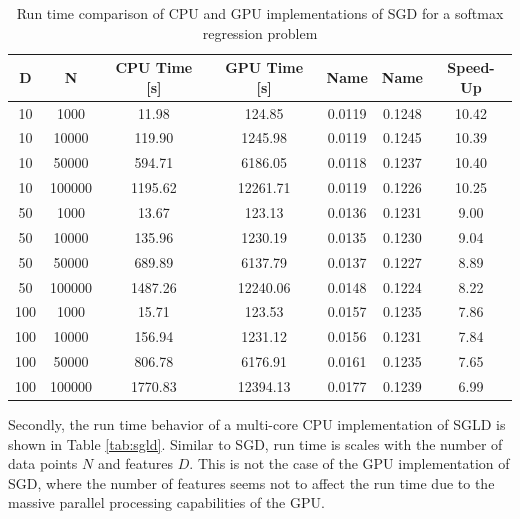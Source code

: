\documentclass[9pt,lineno]{crone}
\begin{document}
\begin{table}[h]
	\centering
 \begin{tabular}{|c|c|c|c|c|c|c|}
 	\hline 
 	D & N & CPU Time [s] & GPU Time [s] & Name & Name & Speed-Up\\ 
 	\hline 
 	10 &	1000&	11.98&	124.85& 0.0119& 0.1248& 10.42\\
 	10&	10000&	119.90&	1245.98& 0.0119& 0.1245& 10.39\\
 	10&	50000&	594.71&	6186.05& 0.0118& 0.1237& 10.40\\
 	10&	100000&	1195.62&	12261.71& 0.0119& 0.1226& 10.25\\
 	\hline
 	50&	1000&	13.67&	123.13& 0.0136& 0.1231& 9.00\\
 	50&	10000&	135.96&	1230.19& 0.0135& 0.1230& 9.04\\
 	50&	50000&	689.89&	6137.79& 0.0137& 0.1227& 8.89\\
 	50&	100000&	1487.26&	12240.06& 0.0148& 0.1224& 8.22\\
 	\hline
 	100&	1000&	15.71&	123.53& 0.0157& 0.1235& 7.86\\
 	100	&10000&	156.94&	1231.12& 0.0156& 0.1231& 7.84\\
 	100&	50000&	806.78&	6176.91& 0.0161& 0.1235& 7.65\\
 	100&	100000&	1770.83&	12394.13& 0.0177& 0.1239& 6.99\\
 	\hline 
 \end{tabular}
\caption{Run time comparison of CPU and GPU implementations of SGD for a softmax regression problem}
\label{tab:sgd} 
\end{table}
 
Secondly, the run time behavior of a multi-core CPU implementation of SGLD is shown in Table \ref{tab:sgld}. Similar to SGD, run time is scales with the number of data points $N$ and features $D$. This is not the case of the GPU implementation of SGD, where the number of features seems not to affect the run time due to the massive parallel processing capabilities of the GPU.
\end{document}
